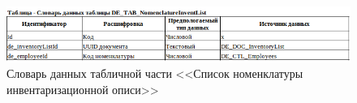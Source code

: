 \begin{figure}[!h]
    \centering
    \includegraphics[width=16cm]
    {assets/InformationalModel/DE_TAB_NomenclatureInventList.png}
    \caption{Словарь данных табличной части <<Список номенклатуры инвентаризационной описи>>}
    \label{fig:InformationalModel_DE_TAB_NomenclatureInventList}
\end{figure}












